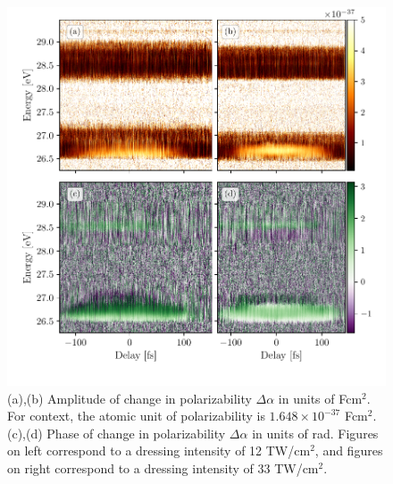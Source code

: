 \begin{figure}
	\centering
	\includegraphics[width=1.0\textwidth]{figures/CATS/amp_ph_delay.pdf}
	\caption[Polarizability amplitude and phase extracted from CATS measurement for two dressing intensities]{(a),(b) Amplitude of change in polarizability $\Delta\alpha$ in units of Fcm$^2$. For context, the atomic unit of polarizability is $1.648\times10^{-37}$ Fcm$^2$. (c),(d) Phase of change in polarizability $\Delta\alpha$ in units of rad.  Figures on left correspond to a dressing intensity of 12 TW/cm$^2$, and figures on right correspond to a dressing intensity of 33 TW/cm$^2$.}
	\label{fig:amp_ph_delay}
\end{figure}

